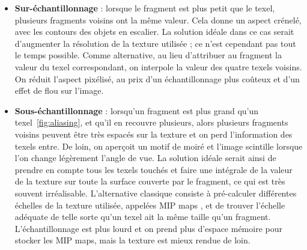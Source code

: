 \begin{itemize}
    \item \textbf{Sur-échantillonnage} : lorsque le fragment est plus petit que le texel, plusieurs fragments voisins ont la même valeur. Cela donne un aspect crénelé, avec les contours des objets en escalier. La solution idéale dans ce cas serait d'augmenter la résolution de la texture utilisée ; ce n'est cependant pas tout le temps possible. Comme alternative, au lieu d'attribuer au fragment la valeur du texel correspondant, on interpole la valeur des quatre texels voisins. On réduit l'aspect pixélisé, au prix d'un échantillonnage plus coûteux et d'un effet de flou sur l'image.
    \item \textbf{Sous-échantillonnage} : lorsqu'un fragment est plus grand qu'un texel~\ref{fig:aliasing}, et qu'il en recouvre plusieurs, alors plusieurs fragments voisins peuvent être très espacés sur la texture et on perd l'information des texels entre. De loin, on aperçoit un motif de moiré et l'image scintille lorsque l'on change légèrement l'angle de vue. La solution idéale serait ainsi de prendre en compte tous les texels touchés et faire une intégrale de la valeur de la texture sur toute la surface couverte par le fragment, ce qui est très souvent irréalisable. L'alternative classique consiste à pré-calculer différentes échelles de la texture utilisée, appelées \og MIP maps \fg, et de trouver l'échelle adéquate de telle sorte qu'un texel ait la même taille qu'un fragment. L'échantillonnage est plus lourd et on prend plus d'espace mémoire pour stocker les MIP maps, mais la texture est mieux rendue de loin.
\end{itemize}


